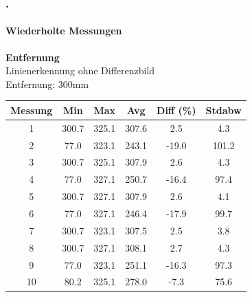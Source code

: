 \documentclass[xcolor=dvipsnames]{beamer}
\def\frametitlesec{\frametitle{\arabic{section}.\hspace{0.5ex}\insertsection}}
\def\framesubtitles#1{\framesubtitle{\hspace{3.5ex}#1}}
\begin{document}
\begin{frame}
	\frametitlesec
	\framesubtitles{Wiederholte Messungen}
		\textbf{Entfernung}\\
	
		Linienerkennung ohne Differenzbild\\
		Entfernung: 300mm
		
		\begin{tabular}{c|c|c|c|c|c}
			Messung & Min & Max & Avg & Diff (\%) & Stdabw \\ \hline
1 & 300.7 & 325.1 & 307.6 & 2.5 & 4.3\\
2 & 77.0 & 323.1 & 243.1 & -19.0 & 101.2\\
3 & 300.7 & 325.1 & 307.9 & 2.6 & 4.3\\
4 & 77.0 & 327.1 & 250.7 & -16.4 & 97.4\\
5 & 300.7 & 327.1 & 307.9 & 2.6 & 4.1\\
6 & 77.0 & 327.1 & 246.4 & -17.9 & 99.7\\
7 & 300.7 & 323.1 & 307.5 & 2.5 & 3.8\\
8 & 300.7 & 327.1 & 308.1 & 2.7 & 4.3\\
9 & 77.0 & 323.1 & 251.1 & -16.3 & 97.3\\
10 & 80.2 & 325.1 & 278.0 & -7.3 & 75.6
		\end{tabular}
	
\end{frame}
\end{document}
